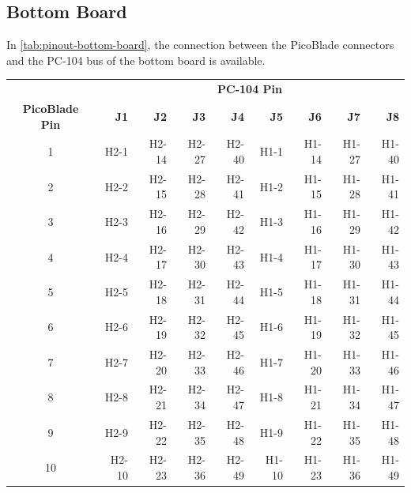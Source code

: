 \subsection{Bottom Board}

In \autoref{tab:pinout-bottom-board}, the connection between the PicoBlade connectors and the PC-104 bus of the bottom board is available.

\begin{table}[!h]
    \centering
    \begin{tabular}{crrrrrrrr}
        \toprule[1.5pt]
                               & \multicolumn{8}{c}{\textbf{PC-104 Pin}} \\
        \textbf{PicoBlade Pin} & \textbf{J1} & \textbf{J2} & \textbf{J3} & \textbf{J4} & \textbf{J5} & \textbf{J6} & \textbf{J7} & \textbf{J8} \\
        \midrule
        1                      & H2-1        & H2-14       & H2-27       & H2-40       & H1-1        & H1-14       & H1-27       & H1-40       \\
        2                      & H2-2        & H2-15       & H2-28       & H2-41       & H1-2        & H1-15       & H1-28       & H1-41       \\
        3                      & H2-3        & H2-16       & H2-29       & H2-42       & H1-3        & H1-16       & H1-29       & H1-42       \\
        4                      & H2-4        & H2-17       & H2-30       & H2-43       & H1-4        & H1-17       & H1-30       & H1-43       \\
        5                      & H2-5        & H2-18       & H2-31       & H2-44       & H1-5        & H1-18       & H1-31       & H1-44       \\
        6                      & H2-6        & H2-19       & H2-32       & H2-45       & H1-6        & H1-19       & H1-32       & H1-45       \\
        7                      & H2-7        & H2-20       & H2-33       & H2-46       & H1-7        & H1-20       & H1-33       & H1-46       \\
        8                      & H2-8        & H2-21       & H2-34       & H2-47       & H1-8        & H1-21       & H1-34       & H1-47       \\
        9                      & H2-9        & H2-22       & H2-35       & H2-48       & H1-9        & H1-22       & H1-35       & H1-48       \\
        10                     & H2-10       & H2-23       & H2-36       & H2-49       & H1-10       & H1-23       & H1-36       & H1-49       \\

\end{tabular}
\end{table}

